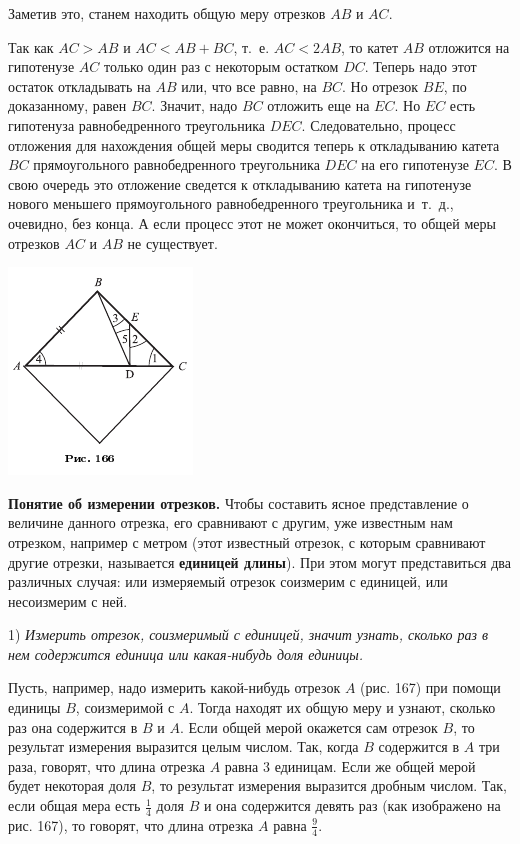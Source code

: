 \documentclass[oneside]{book}
\begin{document}
Заметив это, станем находить общую меру отрезков $AB$ и $AC$.

Так как $AC>AB$ и $AC<AB+BC$, т.~е.
$AC<2AB$, то катет $AB$ отложится на гипотенузе $AC$ только один раз с некоторым остатком $DC$.
Теперь надо этот остаток откладывать на $AB$ или, что все равно, на $BC$.
Но отрезок $BE$, по доказанному, равен $BC$.
Значит, надо $BC$ отложить еще на $EC$.
Но $EC$ есть гипотенуза равнобедренного треугольника $DEC$.
Следовательно, процесс отложения для нахождения общей меры сводится теперь к откладыванию катета $BC$ прямоугольного равнобедренного треугольника $DEC$ на его гипотенузе $EC$.
В свою очередь это отложение сведется к откладыванию катета на гипотенузе нового меньшего прямоугольного равнобедренного треугольника и~т.~д., очевидно, без конца.
А если процесс этот не может окончиться, то общей меры отрезков $AC$ и $AB$ не существует.

\includegraphics{pics/ris-166}

\textbf{Понятие об измерении отрезков.}
Чтобы составить ясное представление о величине данного отрезка, его сравнивают с другим, уже известным нам отрезком, например с метром (этот известный отрезок, с которым сравнивают другие отрезки, называется \textbf{единицей длины}).
При этом могут представиться два различных случая:
или измеряемый отрезок соизмерим с единицей, или несоизмерим с ней.

1) \emph{Измерить отрезок, соизмеримый с единицей, значит узнать, сколько раз в нем содержится единица или какая-нибудь доля единицы.}

Пусть, например, надо измерить какой-нибудь отрезок $A$ (рис. 167) при помощи единицы $B$, соизмеримой с $A$.
Тогда находят их общую меру и узнают, сколько раз она содержится в $B$ и $A$.
Если общей мерой окажется сам отрезок $B$, то результат измерения выразится целым числом.
Так, когда $B$ содержится в $A$ три раза, говорят, что длина отрезка $A$ равна 3 единицам.
Если же общей мерой будет некоторая доля $B$, то результат измерения выразится дробным числом.
Так, если общая мера есть $\tfrac14$ доля $B$ и она содержится девять раз (как изображено на рис. 167), то говорят, что длина отрезка $A$ равна $\tfrac94$.
\end{document}
